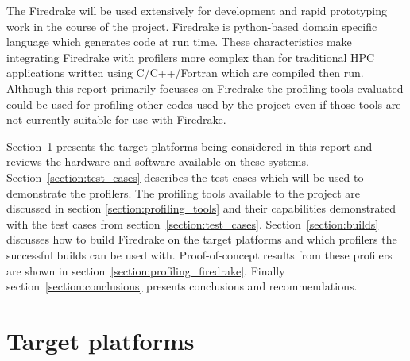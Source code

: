 \documentclass[a4paper,titlepage]{article}
\begin{document}
The Firedrake will be used extensively for development and rapid prototyping work in the course of the project. Firedrake is python-based domain specific language which generates code at run time. These characteristics make integrating Firedrake with profilers more complex than for traditional HPC applications written using C/C++/Fortran which are compiled then run. Although this report primarily focusses on Firedrake the profiling tools evaluated could be used for profiling other codes used by the project even if those tools are not currently suitable for use with Firedrake.

Section~\ref{section:target_platforms} presents the target platforms being considered in this report and reviews the hardware and software available on these systems. Section~\ref{section:test_cases} describes the test cases which will be used to demonstrate the profilers. The profiling tools available to the project are discussed in section \ref{section:profiling_tools} and their capabilities demonstrated with the test cases from section~\ref{section:test_cases}. Section~\ref{section:builds} discusses how to build Firedrake on the target platforms and which profilers the successful builds can be used with. Proof-of-concept results from these profilers are shown in section~\ref{section:profiling_firedrake}. Finally section~\ref{section:conclusions} presents conclusions and recommendations. 


\section{Target platforms}
\label{section:target_platforms}
\end{document}
